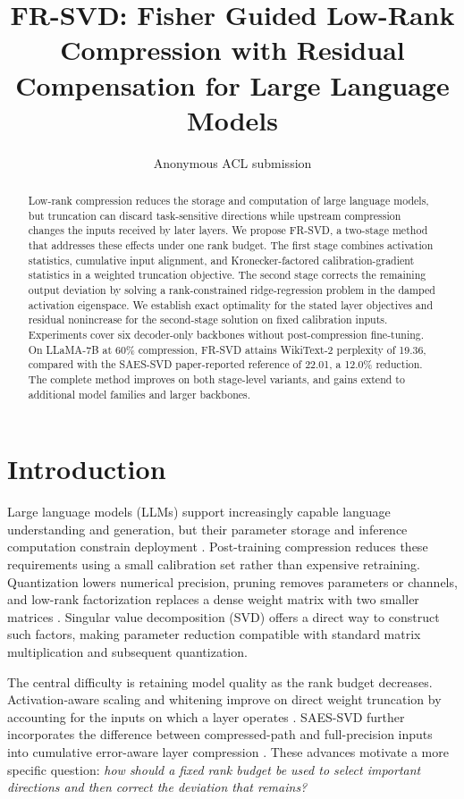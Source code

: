 \documentclass[11pt]{article}
\title{FR-SVD: Fisher Guided Low-Rank Compression with Residual Compensation for Large Language Models}
\author{Anonymous ACL submission}
\begin{document}
\maketitle

\begin{abstract}
Low-rank compression reduces the storage and computation of large language models, but truncation can discard task-sensitive directions while upstream compression changes the inputs received by later layers. We propose FR-SVD, a two-stage method that addresses these effects under one rank budget. The first stage combines activation statistics, cumulative input alignment, and Kronecker-factored calibration-gradient statistics in a weighted truncation objective. The second stage corrects the remaining output deviation by solving a rank-constrained ridge-regression problem in the damped activation eigenspace. We establish exact optimality for the stated layer objectives and residual nonincrease for the second-stage solution on fixed calibration inputs. Experiments cover six decoder-only backbones without post-compression fine-tuning. On LLaMA-7B at 60\% compression, FR-SVD attains WikiText-2 perplexity of 19.36, compared with the SAES-SVD paper-reported reference of 22.01, a 12.0\% reduction. The complete method improves on both stage-level variants, and gains extend to additional model families and larger backbones.
\end{abstract}

\section{Introduction}\label{sec:intro}

Large language models (LLMs) support increasingly capable language understanding and generation, but their parameter storage and inference computation constrain deployment \citep{touvron2023llama,touvron2023llama2,dubey2024llama3}. Post-training compression reduces these requirements using a small calibration set rather than expensive retraining. Quantization lowers numerical precision, pruning removes parameters or channels, and low-rank factorization replaces a dense weight matrix with two smaller matrices \citep{frantar2023gptq,lin2023awq,frantar2023sparsegpt,ma2023llmpruner,ashkboos2024slicegpt}. Singular value decomposition (SVD) offers a direct way to construct such factors, making parameter reduction compatible with standard matrix multiplication and subsequent quantization.

The central difficulty is retaining model quality as the rank budget decreases. Activation-aware scaling and whitening improve on direct weight truncation by accounting for the inputs on which a layer operates \citep{yuan2023asvd,wang2025svdllm,wang2025svdllmv2}. SAES-SVD further incorporates the difference between compressed-path and full-precision inputs into cumulative error-aware layer compression \citep{hu2026saessvd}. These advances motivate a more specific question: \emph{how should a fixed rank budget be used to select important directions and then correct the deviation that remains?}
\end{document}
